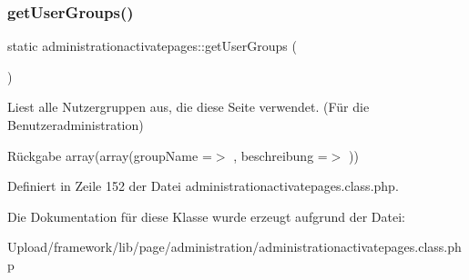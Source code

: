 \mbox{\label{classadministrationactivatepages_a8763c2175e7e3dcc7b97cedc709dea53}} 
\subsubsection{\texorpdfstring{get\+User\+Groups()}{getUserGroups()}}
{\footnotesize\ttfamily static administrationactivatepages\+::get\+User\+Groups (\begin{DoxyParamCaption}{ }\end{DoxyParamCaption})\hspace{0.3cm}{\ttfamily [static]}}

Liest alle Nutzergruppen aus, die diese Seite verwendet. (Für die Benutzeradministration) \begin{DoxyReturn}{Rückgabe}
array(array(\textquotesingle{}group\+Name\textquotesingle{} =$>$ \textquotesingle{}\textquotesingle{}, \textquotesingle{}beschreibung\textquotesingle{} =$>$ \textquotesingle{}\textquotesingle{})) 
\end{DoxyReturn}


Definiert in Zeile 152 der Datei administrationactivatepages.\+class.\+php.



Die Dokumentation für diese Klasse wurde erzeugt aufgrund der Datei\+:\begin{DoxyCompactItemize}
\item 
Upload/framework/lib/page/administration/administrationactivatepages.\+class.\+php\end{DoxyCompactItemize}
